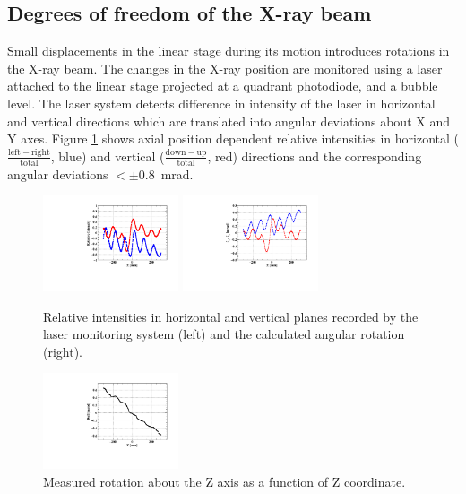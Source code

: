 \subsection{Degrees of freedom of the X-ray beam}
\label{sec:corrections}
    Small displacements in the linear stage during its motion
    introduces rotations in the X-ray beam. The changes in
    the X-ray position are monitored using a laser attached to the
    linear stage projected at a quadrant photodiode, and a bubble
    level. The laser system detects difference in intensity of the
    laser in horizontal and vertical directions which are translated
    into angular deviations about X and Y axes. Figure \ref{fig:dxdy}
    shows axial position dependent relative intensities in horizontal
    ($\frac{\mathrm{left-right}}{\mathrm{total}}$, blue) and vertical
    ($\frac{\mathrm{down-up}}{\mathrm{total}}$, red) directions and the
    corresponding angular deviations $<\pm$0.8~mrad.
    \begin{figure}[]
      \centering
      \includegraphics[width=4cm]{plots/rel_intensity}
      \includegraphics[width=4cm]{plots/angle_dx_dy}
      \caption{Relative intensities in horizontal and vertical planes
      recorded by the laser monitoring system (left) and the calculated angular
      rotation (right).}
      \label{fig:dxdy}
    \end{figure}  
    \begin{figure}[]
      \centering
      \includegraphics[width=4cm]{plots/roll}
      \caption{Measured rotation about the Z axis as a function of Z coordinate.}
      \label{fig:dz}
    \end{figure}  
 

